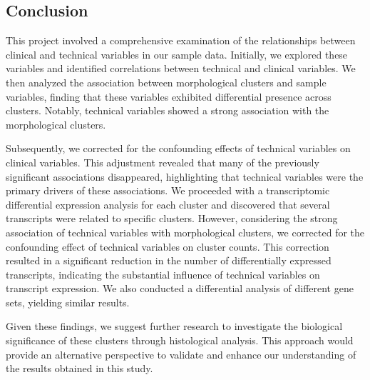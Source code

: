 \documentclass[a4paper, 11pt]{article}
\begin{document}
\begin{multicols}{2}
\section*{Conclusion}
This project involved a comprehensive examination of the relationships between clinical and technical variables in our sample data.
Initially, we explored these variables and identified correlations between technical and clinical variables.
We then analyzed the association between morphological clusters and sample variables, finding that these variables exhibited differential presence across clusters.
Notably, technical variables showed a strong association with the morphological clusters.

Subsequently, we corrected for the confounding effects of technical variables on clinical variables.
This adjustment revealed that many of the previously significant associations disappeared, highlighting that technical variables were the primary drivers of these associations.
We proceeded with a transcriptomic differential expression analysis for each cluster and discovered that several transcripts were related to specific clusters.
However, considering the strong association of technical variables with morphological clusters, we corrected for the confounding effect of technical variables on cluster counts.
This correction resulted in a significant reduction in the number of differentially expressed transcripts, indicating the substantial influence of technical variables on transcript expression.
We also conducted a differential analysis of different gene sets, yielding similar results.

Given these findings, we suggest further research to investigate the biological significance of these clusters through histological analysis.
This approach would provide an alternative perspective to validate and enhance our understanding of the results obtained in this study.



\end{multicols}
\end{document}
